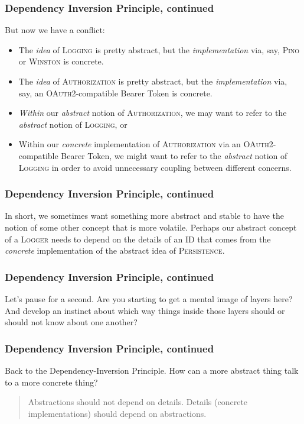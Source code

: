 \documentclass[aspectratio=169]{beamer}
\begin{document}
\begin{frame}[fragile]
  \frametitle{Dependency Inversion Principle, continued}
  But now we have a conflict:

  \begin{itemize}
    \item The \emph{idea} of \textsc{Logging} is pretty abstract, but the
          \emph{implementation} via, say, \textsc{Pino} or \textsc{Winston} is
          concrete.
    \item The \emph{idea} of \textsc{Authorization} is pretty abstract, but the
          \emph{implementation} via, say, an \textsc{OAuth2}-compatible Bearer
          Token is concrete.
    \item \emph{Within} our \emph{abstract} notion of \textsc{Authorization}, we
          may want to refer to the \emph{abstract} notion of \textsc{Logging}, or
    \item Within our \emph{concrete} implementation of \textsc{Authorization} via an
          \textsc{OAuth2}-compatible Bearer Token, we might want to refer to the
          \emph{abstract} notion of \textsc{Logging} in order to avoid unnecessary
          coupling between different concerns.
  \end{itemize}
\end{frame}

\begin{frame}
  \frametitle{Dependency Inversion Principle, continued}
  In short, we sometimes want something more abstract and stable to have the
  notion of some other concept that is more volatile. Perhaps our abstract
  concept of a \textsc{Logger} needs to depend on the details of
  an \textsc{ID} that comes from the \emph{concrete} implementation of the
  abstract idea of \textsc{Persistence}.
\end{frame}

\begin{frame}
  \frametitle{Dependency Inversion Principle, continued}
  Let's pause for a second. Are you starting to get a mental image of layers
  here? And develop an instinct about which way things inside those layers
  should or should not know about one another?
\end{frame}

\begin{frame}
  \frametitle{Dependency Inversion Principle, continued}
  Back to the Dependency-Inversion Principle. How can a more abstract thing talk
  to a more concrete thing?

  \vspace{1em}

  \begin{quote}
    Abstractions should not depend on details. Details (concrete implementations) should depend on abstractions.
  \end{quote}
\end{frame}
\end{document}
